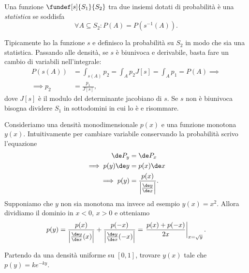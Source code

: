 \begin{definition}[Statistica]
	Una funzione $\fundef[s]{S_1}{S_2}$ tra due insiemi dotati di probabilità è una \emph{statistica} se soddisfa
	\begin{equation*}
		\forall A\subseteq S_2 : P(A) = P(s^{-1}(A)).
	\end{equation*}
\end{definition}

Tipicamente ho la funzione $s$ e definisco la probabilità su $S_2$ in modo che sia una statistica.
Passando alle densità, se $s$ è biunivoca e derivabile, basta fare un cambio di variabili nell'integrale:
\begin{align*}
	P(s(A)) &= \int_{s(A)} p_2 = \int_A p_2 J[s] = \int_A p_1 = P(A) \implies \\
	\implies p_2 &= \frac{p_1}{J[s]},
\end{align*}
dove $J[s]$ è il modulo del determinante jacobiano di $s$.
Se $s$ non è biunivoca bisogna dividere $S_1$ in sottodomini in cui lo è e risommare.

\begin{example}
	\label{th:stat1d}
	Consideriamo una densità monodimensionale $p(x)$ e una funzione monotona $y(x)$.
	Intuitivamente per cambiare variabile conservando la probabilità scrivo l'equazione
	\begin{align*}
		\de P_y &= \de P_x \\
		\implies p(y)\de y &= p(x) \de x \\
		\implies p(y) &= \frac{p(x)}{\left|\frac{\de y}{\de x}\right|}.
	\end{align*}
	Supponiamo che $y$ non sia monotona ma invece ad esempio $y(x)=x^2$.
	Allora dividiamo il dominio in $x<0$, $x>0$ e otteniamo
	\begin{equation*}
		p(y) = \frac{p(x)}{\left|\frac{\de y}{\de x}(x)\right|} + \frac{p(-x)}{\left|\frac{\de y}{\de x}(-x)\right|} =
		\left.\frac{p(x)+p(-x)}{2x}\right|_{x=\sqrt y}.
	\end{equation*}
\end{example}

\begin{exercise}
	Partendo da una densità uniforme su $[0,1]$,
	trovare $y(x)$ tale che $p(y) = ke^{-ky}$.
\end{exercise}

